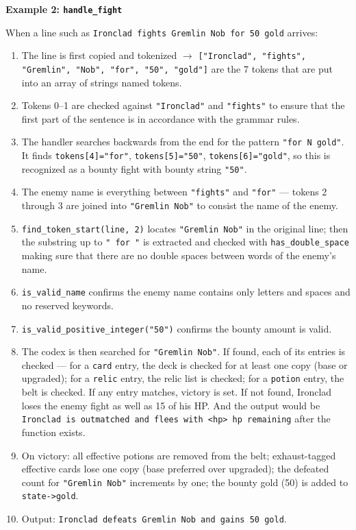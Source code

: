\documentclass[12pt,a4paper]{article}
\begin{document}
\textbf{Example 2: \texttt{handle\_fight}}

When a line such as \texttt{Ironclad fights Gremlin Nob for 50 gold} arrives:

\begin{enumerate}
    \item The line is first copied and tokenized $\rightarrow$ \texttt{["Ironclad", "fights", "Gremlin", "Nob", "for", "50", "gold"]} are the 7 tokens that are put into an array of strings named tokens.
    \item Tokens 0--1 are checked against \texttt{"Ironclad"} and \texttt{"fights"} to ensure that the first part of the sentence is in accordance with the grammar rules.
    \item The handler searches backwards from the end for the pattern \texttt{"for N gold"}. It finds \texttt{tokens[4]="for"}, \texttt{tokens[5]="50"}, \texttt{tokens[6]="gold"}, so this is recognized as a bounty fight with bounty string \texttt{"50"}.
    \item The enemy name is everything between \texttt{"fights"} and \texttt{"for"} --- tokens 2 through 3 are joined into \texttt{"Gremlin Nob"} to consist the name of the enemy.
    \item \texttt{find\_token\_start(line, 2)} locates \texttt{"Gremlin Nob"} in the original line; then the substring up to \texttt{" for "} is extracted and checked with \texttt{has\_double\_space} making sure that there are no double spaces between words of the enemy's name.
    \item \texttt{is\_valid\_name} confirms the enemy name contains only letters and spaces and no reserved keywords.
    \item \texttt{is\_valid\_positive\_integer("50")} confirms the bounty amount is valid.
    \item The codex is then searched for \texttt{"Gremlin Nob"}. If found, each of its entries is checked --- for a \texttt{card} entry, the deck is checked for at least one copy (base or upgraded); for a \texttt{relic} entry, the relic list is checked; for a \texttt{potion} entry, the belt is checked. If any entry matches, victory is set. If not found, Ironclad loses the enemy fight as well as 15 of his HP. And the output would be \texttt{Ironclad is outmatched and flees with <hp> hp remaining} after the function exists.
    \item On victory: all effective potions are removed from the belt; exhaust-tagged effective cards lose one copy (base preferred over upgraded); the defeated count for \texttt{"Gremlin Nob"} increments by one; the bounty gold (50) is added to \texttt{state->gold}.
    \item Output: \texttt{Ironclad defeats Gremlin Nob and gains 50 gold}.
\end{enumerate}
\end{document}
